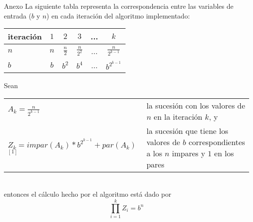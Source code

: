 	\begin{subsection}{Anexo}
		La siguiente tabla representa la correspondencia entre las variables de entrada ($b$ y $n$) en 
		cada iteración del algoritmo implementado:

		\vspace{0.5cm}
		\begin{center}
		\begin{tabular}{|l|c|c|c|c|c|}
			\hline
			iteración   & $1$ & $2$           & $3$             & ... & $k$ \\
			\hline
			$n$         & $n$ & $\frac{n}{2}$ & $\frac{n}{2^2}$ & ... & $\frac{n}{2^{k-1}}$ \\
			\hline
			$b$         & $b$ & $b^2$         & $b^4$           & ... & $b^{2^{k-1}}$ \\
			\hline
		\end{tabular}
		\end{center}

		\vspace{0.5cm}
		\noindent Sean \\
		\indent
		\begin{tabular}{lp{6cm}}
			$A_k = \frac{n}{2^{k-1}}$ & la sucesión con los valores de $n$ en la iteración $k$, y \\
			$Z_k = impar(A_k) * b^{2^{k-1}} + par( A_k )$ $^{[1]}$ & la sucesión que tiene los valores de $b$ corres\-pondientes a los $n$ impares y $1$ en los pares
		\end{tabular} \\
		\vspace{0.2cm}
		entonces el cálculo hecho por el algoritmo está dado por 
		$$\displaystyle\prod_{i=1}^k Z_i = b^n$$


		\vspace{0.5cm}
		 \\
		
	\end{subsection}
